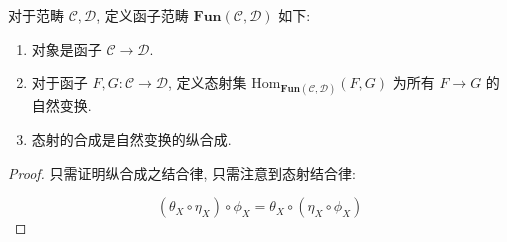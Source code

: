 \begin{definition}
    对于范畴 \(\mathcal{C}, \mathcal{D}\), 定义函子范畴 \(\mathbf{Fun} (\mathcal{C},\mathcal{D})\) 如下:

    \begin{enumerate}
        \item 对象是函子 \(\mathcal{C} \to \mathcal{D}\).
        \item 对于函子 \(F,G : \mathcal{C} \to \mathcal{D}\), 定义态射集 \(\mathrm{Hom}_{\mathbf{Fun} (\mathcal{C},\mathcal{D})} (F,G)\) 为所有 \(F \to G\) 的自然变换.
        \item 态射的合成是自然变换的纵合成.
    \end{enumerate}

    \begin{proof}
        只需证明纵合成之结合律, 只需注意到态射结合律:

        \[
            (\theta_X \circ \eta_X) \circ \phi_X = \theta_X \circ (\eta_X \circ \phi_X)
        \]
    \end{proof}
\end{definition}

